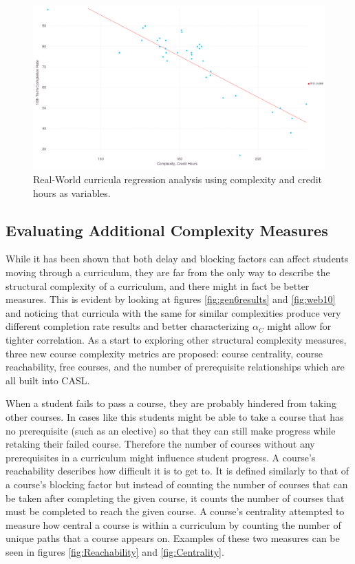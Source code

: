 \documentclass[botnum, fleqn]{unmeethesis}
\begin{document}
    \begin{figure}[h!]
      \centerline{\includegraphics[scale=0.25]{./figures/gradRate10_v_complexity_credits_80.png}}
      \caption{Real-World curricula regression analysis using complexity and credit hours as variables.} 
      \label{fig:wbcompch}
    \end{figure}

    \subsection{Evaluating Additional Complexity Measures}
      While it has been shown that both delay and blocking factors can affect students moving through a curriculum, they are far from the only way to describe the structural complexity of a curriculum, and there might in fact be better measures. This is evident by looking at figures \ref{fig:gen6results} and \ref{fig:web10} and noticing that curricula with the same for similar complexities produce very different completion rate results and better characterizing $\alpha_C$ might allow for tighter correlation. As a start to exploring other structural complexity measures, three new course complexity metrics are proposed: course centrality, course reachability, free courses, and the number of prerequisite relationships which are all built into CASL.

      When a student fails to pass a course, they are probably hindered from taking other courses. In cases like this students might be able to take a course that has no prerequisite (such as an elective) so that they can still make progress while retaking their failed course. Therefore the number of courses without any prerequisites in a curriculum might influence student progress. A course's reachability describes how difficult it is to get to. It is defined similarly to that of a course's blocking factor but instead of counting the number of courses that can be taken after completing the given course, it counts the number of courses that must be completed to reach the given course. A course's centrality attempted to measure how central a course is within a curriculum by counting the number of unique paths that a course appears on. Examples of these two measures can be seen in figures \ref{fig:Reachability} and \ref{fig:Centrality}.
\end{document}
